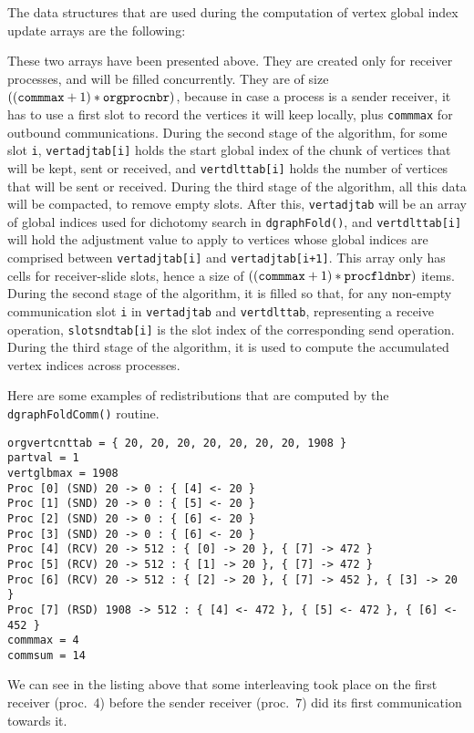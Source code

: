 The data structures that are used during the computation of
vertex global index update arrays are the following:
\begin{itemize}
  These two arrays have been presented above. They are created only
  for receiver processes, and will be filled concurrently. They are of
  size $((\mbox{\texttt{commmax}} + 1) * \mbox{\texttt{orgprocnbr}})$,
  because in case a process is a sender receiver, it has to use a
  first slot to record the vertices it will keep locally, plus
  \texttt{commmax} for outbound communications.  During the second
  stage of the algorithm, for some slot \texttt{i},
  \texttt{vertadjtab[i]} holds the start global index of the chunk of
  vertices that will be kept, sent or received, and
  \texttt{vertdlttab[i]} holds the number of vertices that will be
  sent or received.  During the third stage of the algorithm, all this
  data will be compacted, to remove empty slots. After this,
  \texttt{vertadjtab} will be an array of global indices used for
  dichotomy search in \texttt{dgraph\lbt Fold()}, and
  \texttt{vertdlttab[i]} will hold the adjustment value to apply to
  vertices whose global indices are comprised between
  \texttt{vertadjtab[i]} and \texttt{vertadjtab[i+1]}.
  This array only has cells for receiver-slide slots, hence a size of
  $((\mbox{\texttt{commmax}} + 1) * \mbox{\texttt{procfldnbr}})$
  items. During the second stage of the algorithm, it is filled so
  that, for any non-empty communication slot \texttt{i} in
  \texttt{vertadjtab} and \texttt{vertdlttab}, representing a receive
  operation, \texttt{slotsndtab[i]} is the slot index of the
  corresponding send operation. During the third stage of the
  algorithm, it is used to compute the accumulated vertex indices
  across processes.
\end{itemize}

Here are some examples of redistributions that are computed by the
\texttt{dgraph\lbt Fold\lbt Comm()} routine.

\begin{lstlisting}
orgvertcnttab = { 20, 20, 20, 20, 20, 20, 20, 1908 }
partval = 1
vertglbmax = 1908
Proc [0] (SND) 20 -> 0 : { [4] <- 20 }
Proc [1] (SND) 20 -> 0 : { [5] <- 20 }
Proc [2] (SND) 20 -> 0 : { [6] <- 20 }
Proc [3] (SND) 20 -> 0 : { [6] <- 20 }
Proc [4] (RCV) 20 -> 512 : { [0] -> 20 }, { [7] -> 472 }
Proc [5] (RCV) 20 -> 512 : { [1] -> 20 }, { [7] -> 472 }
Proc [6] (RCV) 20 -> 512 : { [2] -> 20 }, { [7] -> 452 }, { [3] -> 20 }
Proc [7] (RSD) 1908 -> 512 : { [4] <- 472 }, { [5] <- 472 }, { [6] <- 452 }
commmax = 4
commsum = 14
\end{lstlisting}
We can see in the listing above that some interleaving took place
on the first receiver (proc.~4) before the sender receiver (proc.~7)
did its first communication towards it.

